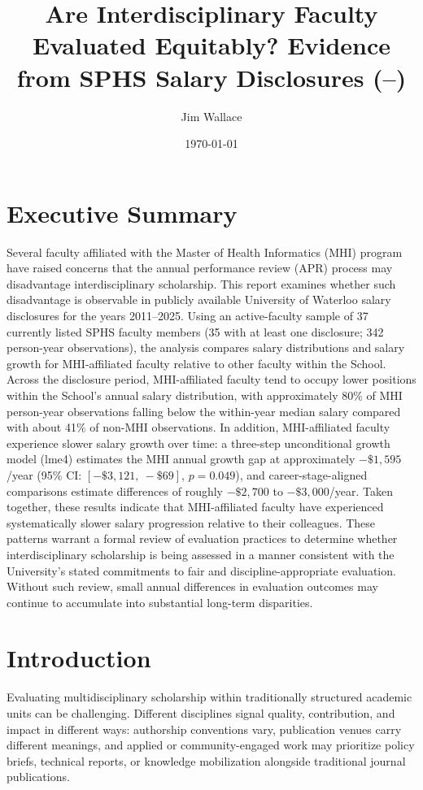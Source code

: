 \documentclass{article}
\title{Are Interdisciplinary Faculty Evaluated Equitably? Evidence from SPHS Salary Disclosures (\DataMinYear--\DataMaxYear)}
\author{Jim Wallace}
\date{\today}
\newcommand{\DataMinYear}{2011}
\newcommand{\DataMaxYear}{2025}
\begin{document}
\maketitle


\section*{Executive Summary}

Several faculty affiliated with the Master of Health Informatics (MHI) program have raised concerns that the annual performance review (APR) process may disadvantage interdisciplinary scholarship. This report examines whether such disadvantage is observable in publicly available University of Waterloo salary disclosures for the years \DataMinYear--\DataMaxYear. Using an active-faculty sample of 37 currently listed SPHS faculty members (35 with at least one disclosure; 342 person-year observations), the analysis compares salary distributions and salary growth for MHI-affiliated faculty relative to other faculty within the School. Across the disclosure period, MHI-affiliated faculty tend to occupy lower positions within the School’s annual salary distribution, with approximately 80\% of MHI person-year observations falling below the within-year median salary compared with about 41\% of non-MHI observations. In addition, MHI-affiliated faculty experience slower salary growth over time: a three-step unconditional growth model (lme4) estimates the MHI annual growth gap at approximately \(-\$1{,}595\)/year (95\% CI: \([-\$3{,}121,\ -\$69]\), \(p = 0.049\)), and career-stage-aligned comparisons estimate differences of roughly \(-\$2{,}700\) to \(-\$3{,}000\)/year. Taken together, these results indicate that MHI-affiliated faculty have experienced systematically slower salary progression relative to their colleagues. These patterns warrant a formal review of evaluation practices to determine whether interdisciplinary scholarship is being assessed in a manner consistent with the University’s stated commitments to fair and discipline-appropriate evaluation. Without such review, small annual differences in evaluation outcomes may continue to accumulate into substantial long-term disparities.



\section*{Introduction}

Evaluating multidisciplinary scholarship within traditionally structured academic units can be challenging. Different disciplines signal quality, contribution, and impact in different ways: authorship conventions vary, publication venues carry different meanings, and applied or community-engaged work may prioritize policy briefs, technical reports, or knowledge mobilization alongside traditional journal publications.
\end{document}
